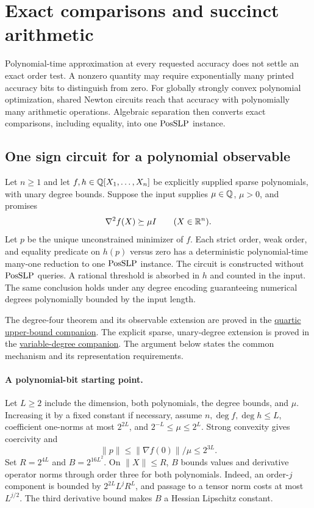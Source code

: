 \section{Exact comparisons and succinct arithmetic}
\label{sec:exact-arithmetic}

Polynomial-time approximation at every requested accuracy does not
settle an exact order test. A nonzero quantity may require exponentially
many printed accuracy bits to distinguish from zero. For globally
strongly convex polynomial optimization, shared Newton circuits reach
that accuracy with polynomially many arithmetic operations. Algebraic
separation then converts exact comparisons, including equality, into
one $\mathrm{PosSLP}$ instance.

\subsection{One sign circuit for a polynomial observable}

\begin{theorem}
\label{thm:exact-upper}
Let $n\ge1$ and let $f,h\in\mathbb Q[X_1,\ldots,X_n]$ be explicitly supplied sparse
polynomials, with unary degree bounds. Suppose the input supplies
$\mu\in\mathbb Q$, $\mu>0$, and promises
\[
 \nabla^2f(X)\succeq\mu I\qquad(X\in\mathbb R^n).
\]
Let $p$ be the unique unconstrained minimizer of $f$. Each strict
order, weak order, and equality predicate on $h(p)$ versus zero has a
deterministic polynomial-time many-one reduction to one $\mathrm{PosSLP}$
instance. The circuit is constructed without $\mathrm{PosSLP}$ queries.
A rational threshold is absorbed in $h$ and counted in the input.
The same conclusion holds under any degree encoding guaranteeing
numerical degrees polynomially bounded by the input length.
\end{theorem}

The degree-four theorem and its observable extension are proved in the
\href{../../research-20260927/strong-convex-quartic-posslp-upper.md}{quartic upper-bound companion}.
The explicit sparse, unary-degree extension is proved in the
\href{../reviews/exact-core/general-degree/strong-convex-polynomial-posslp-upper.md}{variable-degree companion}.
The argument below states the common mechanism and its representation
requirements.

\paragraph{A polynomial-bit starting point.}
Let $L\ge2$ include the dimension, both polynomials, the degree
bounds, and $\mu$. Increasing it by a fixed constant if necessary,
assume $n,\deg f,\deg h\le L$, coefficient one-norms at most
$2^{2L}$, and $2^{-L}\le\mu\le2^L$. Strong convexity gives
coercivity and
\[
 \|p\|\le\|\nabla f(0)\|/\mu\le2^{3L}.
\]
Set $R=2^{4L}$ and $B=2^{16L^2}$. On $\|X\|\le R$,
$B$ bounds values and derivative operator norms through order three
for both polynomials. Indeed, an order-$j$ component is bounded by
$2^{2L}L^jR^L$, and passage to a tensor norm costs at most
$L^{j/2}$. The third derivative bound makes $B$ a Hessian Lipschitz
constant.

